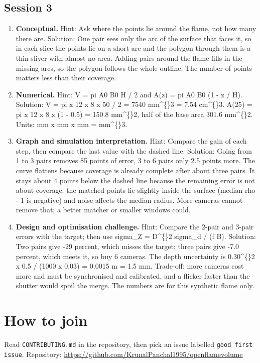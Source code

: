\documentclass[11pt,a4paper]{article}
\begin{document}
\subsection*{Session 3}
\begin{enumerate}[nosep]
\item \textbf{Conceptual.} Hint: Ask where the points lie around the flame, not how many there are. Solution: One pair sees only the arc of the surface that faces it, so in each slice the points lie on a short arc and the polygon through them is a thin sliver with almost no area. Adding pairs around the flame fills in the missing arcs, so the polygon follows the whole outline. The number of points matters less than their coverage.
\item \textbf{Numerical.} Hint: V = pi A0 B0 H / 2 and A(z) = pi A0 B0 (1 - z / H). Solution: V = pi x 12 x 8 x 50 / 2 = 7540 mm\textasciicircum\{\}3 = 7.54 cm\textasciicircum\{\}3. A(25) = pi x 12 x 8 x (1 - 0.5) = 150.8 mm\textasciicircum\{\}2, half of the base area 301.6 mm\textasciicircum\{\}2. Units: mm x mm x mm = mm\textasciicircum\{\}3.
\item \textbf{Graph and simulation interpretation.} Hint: Compare the gain of each step, then compare the last value with the dashed line. Solution: Going from 1 to 3 pairs removes 85 points of error, 3 to 6 pairs only 2.5 points more. The curve flattens because coverage is already complete after about three pairs. It stays about 4 points below the dashed line because the remaining error is not about coverage: the matched points lie slightly inside the surface (median rho - 1 is negative) and noise affects the median radius. More cameras cannot remove that; a better matcher or smaller windows could.
\item \textbf{Design and optimisation challenge.} Hint: Compare the 2-pair and 3-pair errors with the target; then use sigma\_Z = D\textasciicircum\{\}2 sigma\_d / (f B). Solution: Two pairs give -29 percent, which misses the target; three pairs give -7.0 percent, which meets it, so buy 6 cameras. The depth uncertainty is 0.30\textasciicircum\{\}2 x 0.5 / (1000 x 0.03) = 0.0015 m = 1.5 mm. Trade-off: more cameras cost more and must be synchronised and calibrated, and a flicker faster than the shutter would spoil the merge. The numbers are for this synthetic flame only.
\end{enumerate}

\section{How to join}
Read \texttt{CONTRIBUTING.md} in the repository, then pick an issue labelled \texttt{good first issue}. Repository: \url{https://github.com/KrunalPanchal1995/openflamevolume}
\end{document}
